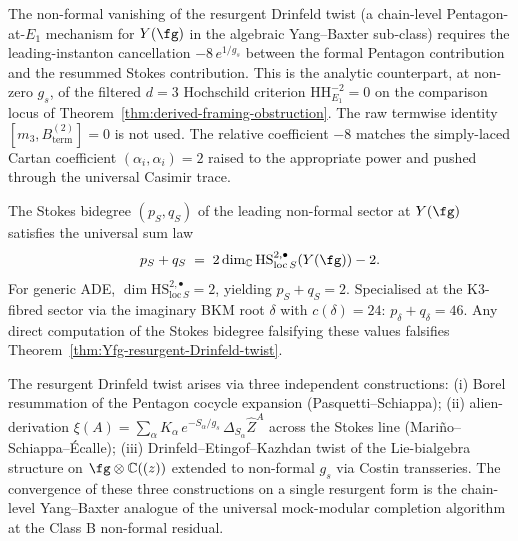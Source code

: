 \begin{remark}
\label{rem:Yfg-non-formal-vanishing}
The non-formal vanishing of the resurgent Drinfeld twist
\textup{(}a chain-level Pentagon-at-$E_1$ mechanism for $Y(\fg)$ in
the algebraic Yang--Baxter sub-class\textup{)} requires the
leading-instanton cancellation $-8\, e^{1 / g_s}$ between the formal
Pentagon contribution and the resummed Stokes contribution. This is
the analytic counterpart, at non-zero $g_s$, of the filtered
$d = 3$ Hochschild criterion $\mathrm{HH}^{-2}_{E_1} = 0$ on the
comparison locus of Theorem~\ref{thm:derived-framing-obstruction}.
The raw termwise identity $[m_3,B^{(2)}_{\mathrm{term}}]=0$ is not used.
The relative coefficient $-8$
matches the simply-laced Cartan coefficient $(\alpha_i, \alpha_i) = 2$
raised to the appropriate power and pushed through the universal
Casimir trace.
\end{remark}

\begin{remark}
\label{rem:Yfg-falsifiable-stokes-bidegree}
The Stokes bidegree $(p_S, q_S)$ of the leading non-formal sector at
$Y(\fg)$ satisfies the universal sum law
\[
 p_S + q_S \;=\; 2 \dim_{\mathbb{C}}
 \mathrm{HS}^{2, \bullet}_{\mathrm{loc}\,S}(Y(\fg)) - 2.
\]
For generic ADE, $\dim \mathrm{HS}^{2, \bullet}_{\mathrm{loc}\,S} = 2$,
yielding $p_S + q_S = 2$. Specialised at the K$3$-fibred sector via
the imaginary BKM root $\delta$ with $c(\delta) = 24$: $p_\delta +
q_\delta = 46$. Any direct computation of the Stokes bidegree
falsifying these values falsifies
Theorem~\ref{thm:Yfg-resurgent-Drinfeld-twist}.
\end{remark}

\begin{remark}
\label{rem:Yfg-resurgent-three-routes}
The resurgent Drinfeld twist arises via three independent
constructions:
\textup{(i)} Borel resummation of the Pentagon cocycle expansion
\textup{(}Pasquetti--Schiappa\textup{);}
\textup{(ii)} alien-derivation $\xi(A) = \sum_\alpha K_\alpha\,
e^{-S_\alpha / g_s}\, \Delta_{S_\alpha} \widehat{Z}^A$ across the
Stokes line \textup{(}Mariño--Schiappa--Écalle\textup{);}
\textup{(iii)} Drinfeld--Etingof--Kazhdan twist of the Lie-bialgebra
structure on $\fg \otimes \mathbb{C}((z))$ extended to non-formal
$g_s$ via Costin transseries.
The convergence of these three constructions on a single resurgent
form is the chain-level Yang--Baxter analogue of the universal
mock-modular completion algorithm at the Class B non-formal residual.
\end{remark}

